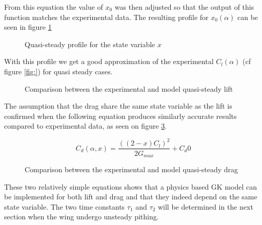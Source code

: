 \par From this equation the value of $x_0$ was then adjusted so that the output of this function matches the experimental data. 
The resulting profile for $x_0(\alpha)$ can be seen in figure \ref{fig:x_0_vs_alpha}

\begin{figure}[h]
	\begin{center}
	\end{center}
	\caption{Quasi-steady profile for the state variable $x$}
	\label{fig:x_0_vs_alpha}
\end{figure}

With this profile we get a good approximation of the experimental $C_l(\alpha)$ (cf figure \ref{fig:}) for quasi steady cases.

\begin{figure}[h]
	\begin{center}
	\end{center}
	\caption{Comparison between the experimental and model quasi-steady lift}
	\label{fig:GK_Cl_vs_alpha}
\end{figure}

\par The assumption that the drag share the same state variable as the lift is confirmed when the following equation produces similarly accurate results compared to experimental data, as seen on figure \ref{fig:GK_Cd_vs_alpha}.

\begin{equation}
	C_d(\alpha,x)= \frac{ \left( \left( 2 - x \right)C_l \right)^2 }{2 G_{max}} + C_d0
	\label{eqn:Cd_function}
\end{equation}

\begin{figure}[h]
	\begin{center}
	\end{center}
	\caption{Comparison between the experimental and model quasi-steady drag}
	\label{fig:GK_Cd_vs_alpha}
\end{figure}

\par These two relatively simple equations shows that a physics based GK model can be implemented for both lift and drag and that they indeed depend on the same state variable.
The two time constants $\tau_1$ and $\tau_2$ will be determined in the next section when the wing undergo unsteady pithing.



